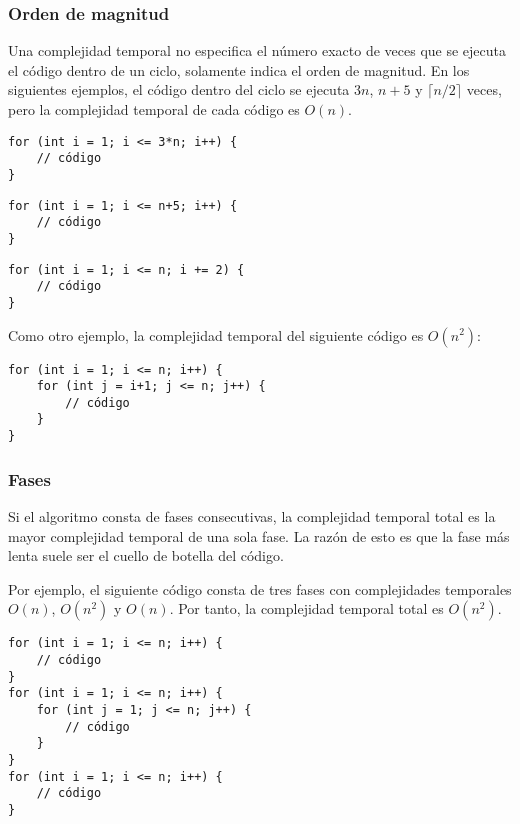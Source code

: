 \subsubsection*{Orden de magnitud}

Una complejidad temporal no especifica el número exacto
de veces que se ejecuta el código dentro de un ciclo,
solamente indica el orden de magnitud.
En los siguientes ejemplos, el código dentro del ciclo
se ejecuta $3n$, $n+5$ y $\lceil n/2 \rceil$ veces,
pero la complejidad temporal de cada código es $O(n)$.

\begin{lstlisting}
for (int i = 1; i <= 3*n; i++) {
    // código
}
\end{lstlisting}

\begin{lstlisting}
for (int i = 1; i <= n+5; i++) {
    // código
}
\end{lstlisting}

\begin{lstlisting}
for (int i = 1; i <= n; i += 2) {
    // código
}
\end{lstlisting}

Como otro ejemplo,
la complejidad temporal del siguiente código es $O(n^2)$:

\begin{lstlisting}
for (int i = 1; i <= n; i++) {
    for (int j = i+1; j <= n; j++) {
        // código
    }
}
\end{lstlisting}

\subsubsection*{Fases}

Si el algoritmo consta de fases consecutivas,
la complejidad temporal total es la mayor
complejidad temporal de una sola fase.
La razón de esto es que la fase más lenta
suele ser el cuello de botella del código.

Por ejemplo, el siguiente código consta
de tres fases con complejidades temporales
$O(n)$, $O(n^2)$ y $O(n)$.
Por tanto, la complejidad temporal total es $O(n^2)$.

\begin{lstlisting}
for (int i = 1; i <= n; i++) {
    // código
}
for (int i = 1; i <= n; i++) {
    for (int j = 1; j <= n; j++) {
        // código
    }
}
for (int i = 1; i <= n; i++) {
    // código
}
\end{lstlisting}

